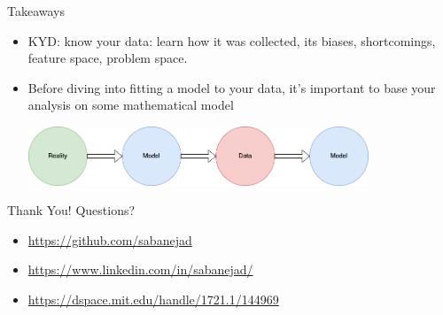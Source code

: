 \documentclass{beamer}
\begin{document}
\begin{frame}{Takeaways}
  \begin{itemize}
    \item<+-> KYD: know your data: learn how it was collected, its biases, shortcomings, feature space, problem space.
    \item<+-> Before diving into fitting a model to your data, it's important to base your analysis on some mathematical model
    \vspace{1cm}
    \begin{center}
    \includegraphics[width=0.8\textwidth]{images/reality-model-data.png}
    \end{center}
  \end{itemize}
\end{frame}

\begin{frame}{Thank You! Questions?}
  \begin{itemize}
  \item \url{https://github.com/sabanejad}
  \item \url{https://www.linkedin.com/in/sabanejad/}
  \item \url{https://dspace.mit.edu/handle/1721.1/144969}
  \end{itemize}
\end{frame}



\end{document}
